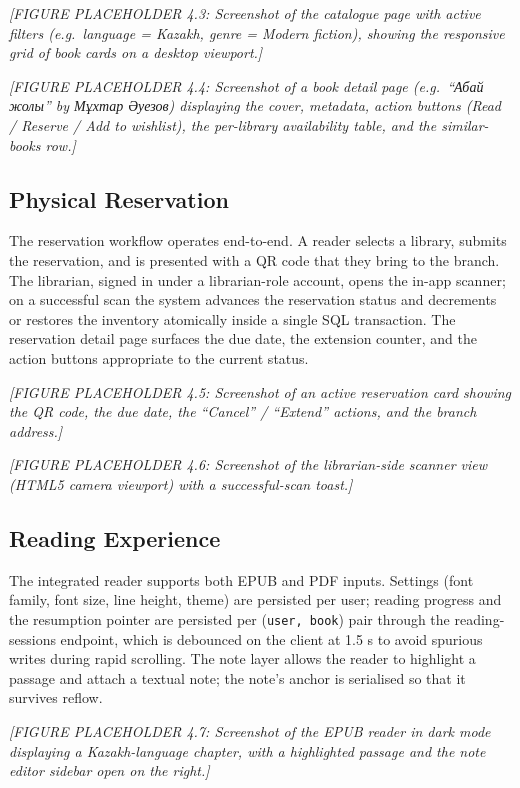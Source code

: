\documentclass[12pt,a4paper]{report}
\begin{document}
\textit{[FIGURE PLACEHOLDER 4.3: Screenshot of the catalogue page with
active filters (e.g.\ language = Kazakh, genre = Modern fiction),
showing the responsive grid of book cards on a desktop viewport.]}

\textit{[FIGURE PLACEHOLDER 4.4: Screenshot of a book detail page (e.g.\
``Абай жолы'' by Мұхтар Әуезов) displaying the cover, metadata, action
buttons (Read / Reserve / Add to wishlist), the per-library availability
table, and the similar-books row.]}

\subsection{Physical Reservation}

The reservation workflow operates end-to-end. A reader selects a
library, submits the reservation, and is presented with a QR code that
they bring to the branch. The librarian, signed in under a
librarian-role account, opens the in-app scanner; on a successful scan
the system advances the reservation status and decrements or restores
the inventory atomically inside a single SQL transaction. The
reservation detail page surfaces the due date, the extension counter,
and the action buttons appropriate to the current status.

\textit{[FIGURE PLACEHOLDER 4.5: Screenshot of an active reservation
card showing the QR code, the due date, the ``Cancel'' / ``Extend''
actions, and the branch address.]}

\textit{[FIGURE PLACEHOLDER 4.6: Screenshot of the librarian-side
scanner view (HTML5 camera viewport) with a successful-scan toast.]}

\subsection{Reading Experience}

The integrated reader supports both EPUB and PDF inputs. Settings (font
family, font size, line height, theme) are persisted per user; reading
progress and the resumption pointer are persisted per (\texttt{user,
book}) pair through the reading-sessions endpoint, which is debounced
on the client at 1.5 s to avoid spurious writes during rapid scrolling.
The note layer allows the reader to highlight a passage and attach a
textual note; the note's anchor is serialised so that it survives reflow.

\textit{[FIGURE PLACEHOLDER 4.7: Screenshot of the EPUB reader in dark
mode displaying a Kazakh-language chapter, with a highlighted passage
and the note editor sidebar open on the right.]}
\end{document}
